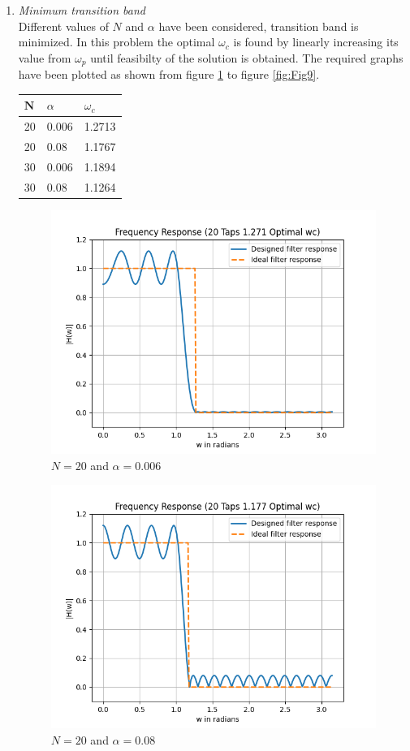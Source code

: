 \documentclass[conference]{IEEEtran}
\begin{document}
\begin{enumerate}[label=(\alph*)]
\item \textit{Minimum transition band}\\
Different values of $N$ and $\alpha$ have been considered, transition band is minimized. In this problem the optimal $\omega_c$ is found by linearly increasing its value from $\omega_p$ until feasibilty of the solution is obtained. The required graphs have been plotted as shown from figure \ref{fig:Fig6} to figure \ref{fig:Fig9}. 
\vspace{3mm}
\begin{center}
\begin{tabular}{ | m{3em} | m{1cm}| m{1cm}| } 
  \hline
  $\textbf{N}$& \textbf{$\alpha$}&\textbf{$\omega_c$}\\ 
  \hline
  20 & 0.006& 1.2713\\ 
  \hline
  20 & 0.08& 1.1767 \\ 
  \hline
  30 & 0.006& 1.1894 \\ 
  \hline
  30 & 0.08& 1.1264 \\ 
  \hline
\end{tabular}
\end{center}
\begin{figure}[!h]
	\begin{center} 
	    \includegraphics[width=0.7\columnwidth]{figs/B/N20_a1}
	\end{center}
\caption{$N=20$ and $\alpha = 0.006$}
\label{fig:Fig6}
\end{figure}

\begin{figure}[!h]
	\begin{center} 
	    \includegraphics[width=0.7\columnwidth]{figs/B/N20_a2}
	\end{center}
\caption{$N=20$ and $\alpha = 0.08$}
\label{fig:Fig7}
\end{figure}


\end{enumerate}
\end{document}

